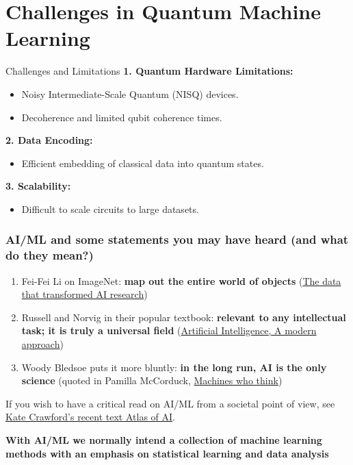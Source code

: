 \documentclass{beamer}
\begin{document}
\section{Challenges in Quantum Machine Learning}
\begin{frame}{Challenges and Limitations}
\textbf{1. Quantum Hardware Limitations:}
\begin{itemize}
    \item Noisy Intermediate-Scale Quantum (NISQ) devices.
    \item Decoherence and limited qubit coherence times.
\end{itemize}

\textbf{2. Data Encoding:}
\begin{itemize}
    \item Efficient embedding of classical data into quantum states.
\end{itemize}

\textbf{3. Scalability:}
\begin{itemize}
    \item Difficult to scale circuits to large datasets.
\end{itemize}
\end{frame}



\begin{frame}
\frametitle{AI/ML and some statements you may have heard (and what do they mean?)}



\begin{enumerate}
\item Fei-Fei Li on ImageNet: \textbf{map out the entire world of objects} (\href{{https://cacm.acm.org/news/219702-the-data-that-transformed-ai-research-and-possibly-the-world/fulltext}}{The data that transformed AI research})

\item Russell and Norvig in their popular textbook: \textbf{relevant to any intellectual task; it is truly a universal field} (\href{{http://aima.cs.berkeley.edu/}}{Artificial Intelligence, A modern approach})

\item Woody Bledsoe puts it more bluntly: \textbf{in the long run, AI is the only science} (quoted in Pamilla McCorduck, \href{{https://www.pamelamccorduck.com/machines-who-think}}{Machines who think})
\end{enumerate}

\noindent
If you wish to have a critical read on AI/ML from a societal point of view, see \href{{https://www.katecrawford.net/}}{Kate Crawford's recent text Atlas of AI}.

\textbf{With AI/ML we normally intend a collection of machine learning methods with an emphasis on statistical learning and data analysis}
\end{frame}
\end{document}
